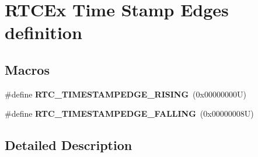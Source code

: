\hypertarget{group___r_t_c_ex___time___stamp___edges__definitions}{}\section{R\+T\+C\+Ex Time Stamp Edges definition}
\label{group___r_t_c_ex___time___stamp___edges__definitions}
\subsection*{Macros}
\begin{DoxyCompactItemize}
\item 
\mbox{\label{group___r_t_c_ex___time___stamp___edges__definitions_gaae434219f837fa77058fdbfc0a4b24d0}} 
\#define {\bfseries R\+T\+C\+\_\+\+T\+I\+M\+E\+S\+T\+A\+M\+P\+E\+D\+G\+E\+\_\+\+R\+I\+S\+I\+NG}~(0x00000000\+U)
\item 
\mbox{\label{group___r_t_c_ex___time___stamp___edges__definitions_ga5ddd88325303593d4fbaf29123037c95}} 
\#define {\bfseries R\+T\+C\+\_\+\+T\+I\+M\+E\+S\+T\+A\+M\+P\+E\+D\+G\+E\+\_\+\+F\+A\+L\+L\+I\+NG}~(0x00000008\+U)
\end{DoxyCompactItemize}


\subsection{Detailed Description}
